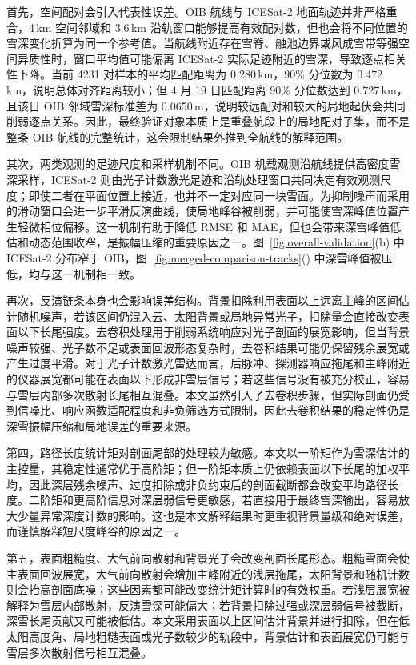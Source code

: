 首先，空间配对会引入代表性误差。OIB 航线与 ICESat-2 地面轨迹并非严格重合，4\,km 空间邻域和 3.6\,km 沿轨窗口能够提高有效配对数，但也会将不同位置的雪深变化折算为同一个参考值。当航线附近存在雪脊、融池边界或风成雪带等强空间异质性时，窗口平均值可能偏离 ICESat-2 实际足迹附近的雪深，导致逐点相关性下降。当前 4231 对样本的平均匹配距离为 0.280\,km，90\% 分位数为 0.472\,km，说明总体对齐距离较小；但 4 月 19 日匹配距离 90\% 分位数达到 0.727\,km，且该日 OIB 邻域雪深标准差为 0.0650\,m，说明较远配对和较大的局地起伏会共同削弱逐点关系。因此，最终验证对象本质上是重叠航段上的局地配对子集，而不是整条 OIB 航线的完整统计，这会限制结果外推到全航线的解释范围。

其次，两类观测的足迹尺度和采样机制不同。OIB 机载观测沿航线提供高密度雪深采样，ICESat-2 则由光子计数激光足迹和沿轨处理窗口共同决定有效观测尺度；即使二者在平面位置上接近，也并不一定对应同一块雪面。为抑制噪声而采用的滑动窗口会进一步平滑反演曲线，使局地峰谷被削弱，并可能使雪深峰值位置产生轻微相位偏移。这一机制有助于降低 RMSE 和 MAE，但也会带来深雪峰值低估和动态范围收窄，是振幅压缩的重要原因之一。图~\ref{fig:overall-validation}(b) 中 ICESat-2 分布窄于 OIB，图~\ref{fig:merged-comparison-tracks}() 中深雪峰值被压低，均与这一机制相一致。

再次，反演链条本身也会影响误差结构。背景扣除利用表面以上远离主峰的区间估计随机噪声，若该区间仍混入云、太阳背景或局地异常光子，扣除量会直接改变表面以下长尾强度。去卷积处理用于削弱系统响应对光子剖面的展宽影响，但当背景噪声较强、光子数不足或表面回波形态复杂时，去卷积结果可能仍保留残余展宽或产生过度平滑。对于光子计数激光雷达而言，后脉冲、探测器响应拖尾和主峰附近的仪器展宽都可能在表面以下形成非雪层信号；若这些信号没有被充分校正，容易与雪层内部多次散射长尾相互混叠。本文虽然引入了去卷积步骤，但实际剖面仍受到信噪比、响应函数适配程度和非负筛选方式限制，因此去卷积结果的稳定性仍是深雪振幅压缩和局地误差的重要来源。

第四，路径长度统计矩对剖面尾部的处理较为敏感。本文以一阶矩作为雪深估计的主控量，其稳定性通常优于高阶矩；但一阶矩本质上仍依赖表面以下长尾的加权平均，因此深层残余噪声、过度扣除或非负约束后的剖面截断都会改变平均路径长度。二阶矩和更高阶信息对深层弱信号更敏感，若直接用于最终雪深输出，容易放大少量异常深度计数的影响。这也是本文解释结果时更重视背景量级和绝对误差，而谨慎解释短尺度峰谷的原因之一。

第五，表面粗糙度、大气前向散射和背景光子会改变剖面长尾形态。粗糙雪面会使主表面回波展宽，大气前向散射会增加主峰附近的浅层拖尾，太阳背景和随机计数则会抬高剖面底噪；这些因素都可能改变统计矩计算时的有效权重。若浅层展宽被解释为雪层内部散射，反演雪深可能偏大；若背景扣除过强或深层弱信号被截断，深雪长尾贡献又可能被低估。本文采用表面以上区间估计背景并进行扣除，但在低太阳高度角、局地粗糙表面或光子数较少的轨段中，背景估计和表面展宽仍可能与雪层多次散射信号相互混叠。


